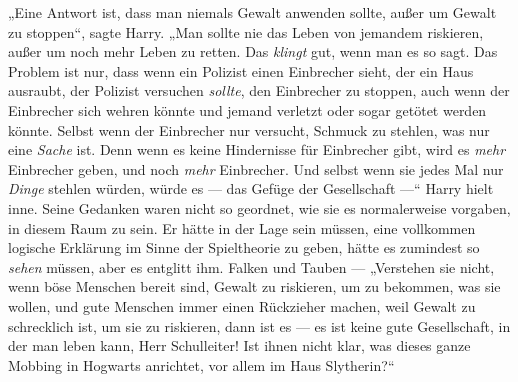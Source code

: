 „Eine Antwort ist, dass man niemals Gewalt anwenden sollte, außer um Gewalt zu stoppen“, sagte Harry.
„Man sollte nie das Leben von jemandem riskieren, außer um noch mehr Leben zu retten. Das \emph{klingt} gut, wenn man es so sagt. Das Problem ist nur, dass wenn ein Polizist einen Einbrecher sieht, der ein Haus ausraubt, der Polizist versuchen \emph{sollte}, den Einbrecher zu stoppen, auch wenn der Einbrecher sich wehren könnte und jemand verletzt oder sogar getötet werden könnte. Selbst wenn der Einbrecher nur versucht, Schmuck zu stehlen, was nur eine \emph{Sache} ist. Denn wenn es keine Hindernisse für Einbrecher gibt, wird es \emph{mehr} Einbrecher geben, und noch \emph{mehr} Einbrecher. Und selbst wenn sie jedes Mal nur \emph{Dinge} stehlen würden, würde es — das Gefüge der Gesellschaft —“ Harry hielt inne. Seine Gedanken waren nicht so geordnet, wie sie es normalerweise vorgaben, in diesem Raum zu sein. Er hätte in der Lage sein müssen, eine vollkommen logische Erklärung im Sinne der Spieltheorie zu geben, hätte es zumindest so \emph{sehen} müssen, aber es entglitt ihm. Falken und Tauben —
„Verstehen sie nicht, wenn böse Menschen bereit sind, Gewalt zu riskieren, um zu bekommen, was sie wollen, und gute Menschen immer einen Rückzieher machen, weil Gewalt zu schrecklich ist, um sie zu riskieren, dann ist es — es ist keine gute Gesellschaft, in der man leben kann, Herr Schulleiter! Ist ihnen nicht klar, was dieses ganze Mobbing in Hogwarts anrichtet, vor allem im Haus Slytherin?“

